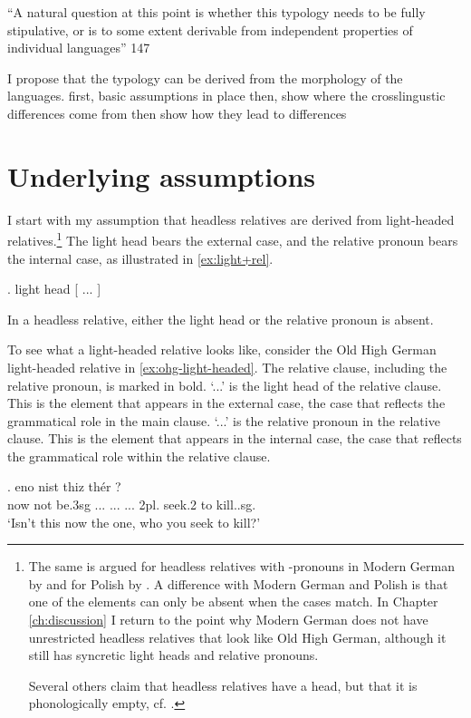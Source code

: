 ``A natural question at this point is whether this typology needs to be fully stipulative, or is to some extent derivable from independent properties of individual languages'' \citet{grosu1994}{147}

I propose that the typology can be derived from the morphology of the languages.
first, basic assumptions in place
then, show where the crosslingustic differences come from
then show how they lead to differences

\section{Underlying assumptions}

I start with my assumption that headless relatives are derived from light-headed relatives.\footnote{
The same is argued for headless relatives with -pronouns in Modern German by \citealt{fuss2014,hanink2018} and for Polish by \citealt{citko2004}.
A difference with Modern German and Polish is that one of the elements can only be absent when the cases match. In Chapter \ref{ch:discussion} I return to the point why Modern German does not have unrestricted headless relatives that look like Old High German, although it still has syncretic light heads and relative pronouns.

Several others claim that headless relatives have a head, but that it is phonologically empty, cf. \citealt{bresnan1978,groos1981,himmelreich2017}.
}
The light head bears the external case, and the relative pronoun bears the internal case, as illustrated in \ref{ex:light+rel}.

\ex. light head [ ... ]\label{ex:light+rel}

In a headless relative, either the light head or the relative pronoun is absent.

To see what a light-headed relative looks like, consider the Old High German light-headed relative in \ref{ex:ohg-light-headed}. The relative clause, including the relative pronoun, is marked in bold.
 `...' is the light head of the relative clause. This is the element that appears in the external case, the case that reflects the grammatical role in the main clause.
 `...' is the relative pronoun in the relative clause. This is the element that appears in the internal case, the case that reflects the grammatical role within the relative clause.

\exg. eno nist thiz thér     ?\\
 now {not be.3\ac{sg}} ... ...
 ... 2\ac{pl}. seek.2 to kill..\ac{sg}.\\
 `Isn't this now the one, who you seek to kill?'\label{ex:ohg-light-headed}

